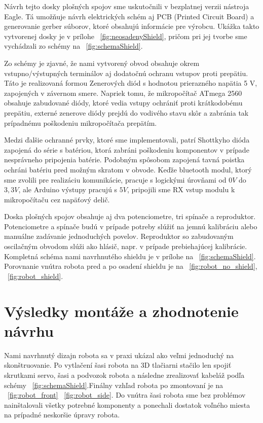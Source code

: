 Návrh tejto dosky plošných spojov sme uskutočnili v bezplatnej verzii nástroja Eagle. Tá umožňuje návrh elektrických schém aj PCB (Printed Circuit Board) a generovanie gerber súborov, ktoré obsahujú informácie pre výrobcu. Ukážka takto vytvorenej dosky je v prílohe \figurename~\ref{fig:neosadenyShield}, pričom pri jej tvorbe sme vychádzali zo schémy na \figurename~\ref{fig:schemaShield}. 

Zo schémy je zjavné, že nami vytvorený obvod obsahuje okrem vstupno/výstupných terminálov aj dodatočnú ochranu vstupov proti prepätiu. Táto je realizovaná formou Zenerových diód s hodnotou prierazného napätia 5 V, zapojených v závernom smere. Napriek tomu, že mikropočítač ATmega 2560 obsahuje zabudované diódy, ktoré vedia vstupy ochrániť proti krátkodobému prepätiu, externé zenerove diódy prejdú do vodivého stavu skôr a zabránia tak prípadnému poškodeniu mikropočítača prepätím. 

Medzi ďalšie ochranné prvky, ktoré sme implementovali, patrí Shottkyho dióda zapojená do série s batériou, ktorá zabráni poškodeniu komponentov v prípade nesprávneho pripojenia batérie. Podobným spôsobom zapojená tavná poistka ochráni batériu pred možným skratom v obvode.  Keďže bluetooth modul, ktorý sme zvolili pre realizáciu komunikácie, pracuje s logickými úrovňami od $0 V$ do $3,3 V$, ale Arduino výstupy pracujú s $5 V$, pripojili sme RX vstup modulu k mikropočítaču cez napäťový delič. 

Doska plošných spojov obsahuje aj dva potenciometre, tri spínače a reproduktor. Potenciometre a spínače budú v prípade potreby slúžiť na jemnú kalibráciu alebo manuálne zadávanie jednoduchých povelov. Reproduktor so zabudovaným oscilačným obvodom slúži ako hlásič, napr. v prípade prebiehajúcej kalibrácie. Kompletná schéma nami navrhnutého shieldu je v prílohe na \figurename~\ref{fig:schemaShield}. Porovnanie vnútra robota pred a po osadení shieldu je na \figurename~\ref{fig:robot_no_shield}, \figurename~\ref{fig:robot_shield}.

\section{Výsledky montáže a zhodnotenie návrhu}
Nami navrhnutý dizajn robota sa v praxi ukázal ako veľmi jednoduchý na skonštruovanie. Po vytlačení šasi robota na 3D tlačiarni stačilo len spojiť skrutkami servo, šasi a podvozok robota a následne zrealizovať kabeláž podľa schémy \figurename~\ref{fig:schemaShield}.Finálny vzhľad robota po zmontovaní je na \figurename~\ref{fig:robot_front} \figurename~\ref{fig:robot_side}. Do vnútra šasi robota sme bez problémov nainštalovali všetky potrebné komponenty a ponechali dostatok voľného miesta na prípadné neskoršie úpravy robota.   

